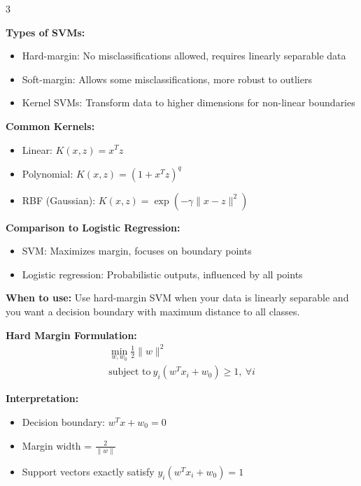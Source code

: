 \documentclass[10pt,landscape]{article}
\begin{document}
\begin{multicols}{3}
\begin{tcolorbox}[breakable, title=4. Support Vector Machines Concepts, colback=svm]
\textbf{Types of SVMs:}
\begin{itemize}[leftmargin=*,noitemsep,topsep=0pt]
    \item Hard-margin: No misclassifications allowed, requires linearly separable data
    \item Soft-margin: Allows some misclassifications, more robust to outliers
    \item Kernel SVMs: Transform data to higher dimensions for non-linear boundaries
\end{itemize}

\textbf{Common Kernels:}
\begin{itemize}[leftmargin=*,noitemsep,topsep=0pt]
    \item Linear: $K(x,z) = x^Tz$
    \item Polynomial: $K(x,z) = (1 + x^Tz)^q$
    \item RBF (Gaussian): $K(x,z) = \exp(-\gamma\|x-z\|^2)$
\end{itemize}

\textbf{Comparison to Logistic Regression:}
\begin{itemize}[leftmargin=*,noitemsep,topsep=0pt]
    \item SVM: Maximizes margin, focuses on boundary points
    \item Logistic regression: Probabilistic outputs, influenced by all points
\end{itemize}
\end{tcolorbox}

\begin{tcolorbox}[breakable, title=4.1 Maximum Margin Classification, colback=svm]
\textbf{When to use:} Use hard-margin SVM when your data is linearly separable and you want a decision boundary with maximum distance to all classes.

\textbf{Hard Margin Formulation:}
\begin{align}
\min_{w,w_0} \frac{1}{2}\|w\|^2 \\
\text{subject to}~y_i(w^Tx_i + w_0) \geq 1,~\forall i
\end{align}

\textbf{Interpretation:}
\begin{itemize}[leftmargin=*,noitemsep,topsep=0pt]
    \item Decision boundary: $w^Tx + w_0 = 0$
    \item Margin width = $\frac{2}{\|w\|}$
    \item Support vectors exactly satisfy $y_i(w^Tx_i + w_0) = 1$
\end{itemize}


\end{tcolorbox}
\end{multicols}
\end{document}
